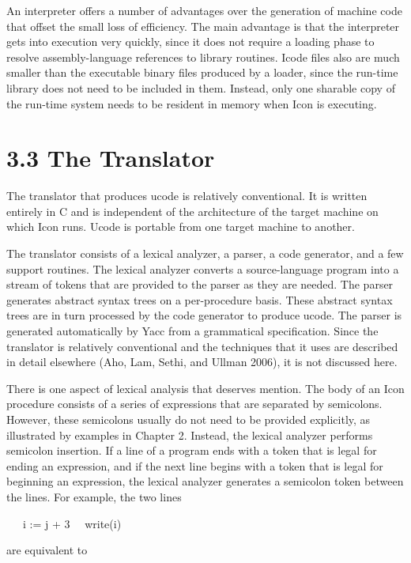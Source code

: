 An interpreter offers a number of advantages over the generation of
machine code that offset the small loss of efficiency. The main
advantage is that the interpreter gets into execution very quickly,
since it does not require a loading phase to resolve assembly-language
references to library routines. Icode files also are much smaller than
the executable binary files produced by a loader, since the run-time
library does not need to be included in them. Instead, only one
sharable copy of the run-time system needs to be resident in memory
when Icon is executing.


\section[3.3 The Translator]{3.3 The Translator}

The translator that produces ucode is relatively conventional. It is
written entirely in C and is independent of the architecture of the
target machine on which Icon runs. Ucode is portable from one target
machine to another.

The translator consists of a lexical analyzer, a parser, a code
generator, and a few support routines. The lexical analyzer converts a
source-language program into a stream of tokens that are provided to
the parser as they are needed.  The parser generates abstract syntax
trees on a per-procedure basis. These abstract syntax trees are in
turn processed by the code generator to produce ucode. The parser is
generated automatically by Yacc from a grammatical specification.
Since the translator is relatively conventional and the techniques
that it uses are described in detail elsewhere (Aho, Lam, Sethi, and
Ullman 2006), it is not discussed here.

There is one aspect of lexical analysis that deserves mention. The
body of an Icon procedure consists of a series of expressions that are
separated by semicolons. However, these semicolons usually do not need
to be provided explicitly, as illustrated by examples in Chapter
2. Instead, the lexical analyzer performs semicolon insertion. If a
line of a program ends with a token that is legal for ending an
expression, and if the next line begins with a token that is legal for
beginning an expression, the lexical analyzer generates a semicolon
token between the lines. For example, the two lines

{\ttfamily
\ \ \ i := j\textit{ }+ 3\newline
 \ \ write(i)}

\noindent are equivalent to

